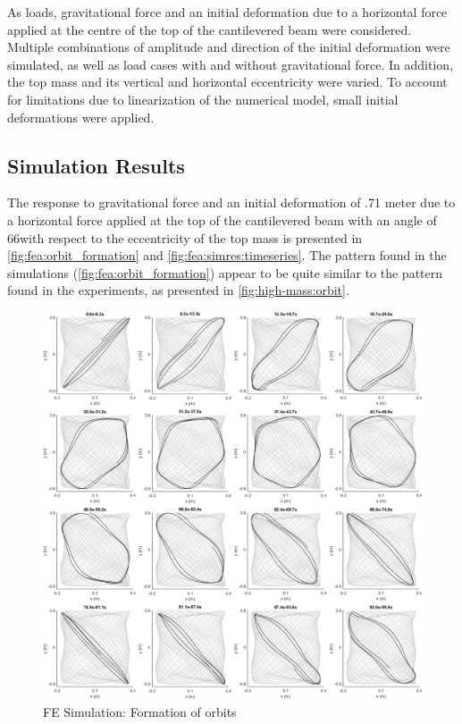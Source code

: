 \documentclass{article}
\begin{document}
As loads, gravitational force and an initial deformation due to a horizontal force applied at the centre of the top of the cantilevered beam were considered. Multiple combinations of amplitude and direction of the initial deformation were simulated, as well as load cases with and without gravitational force. In addition, the top mass and its vertical and horizontal eccentricity were varied. To account for limitations due to linearization of the numerical model, small initial deformations were applied.

\subsection{Simulation Results}

The response to gravitational force and an initial deformation of .71 meter due to a horizontal force applied at the top of the  cantilevered beam with an angle of 66\textdegree with respect to the eccentricity of the top mass is presented in  \autoref{fig:fea:orbit_formation} and \autoref{fig:fea:simres:timeseries}. The pattern found in the simulations (\autoref{fig:fea:orbit_formation}) appear to be quite similar to the pattern found in the experiments, as presented in  \autoref{fig:high-mass:orbit}.

\begin{figure}
    \centering
    \includegraphics[width=1\textwidth]{figures/OrbitFormation.png}
    \caption{FE Simulation: Formation of orbits}
    \label{fig:fea:orbit_formation}
\end{figure}
\end{document}
